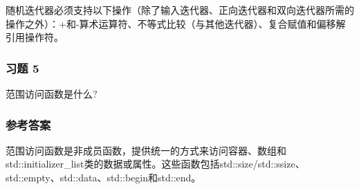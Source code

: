 随机迭代器必须支持以下操作（除了输入迭代器、正向迭代器和双向迭代器所需的操作之外）：+和-算术运算符、不等式比较（与其他迭代器）、复合赋值和偏移解引用操作符。

\subsubsection{习题 5}

范围访问函数是什么?

\subsubsection{参考答案}

范围访问函数是非成员函数，提供统一的方式来访问容器、数组和std::initializer\_list类的数据或属性。这些函数包括std::size/std::ssize、std::empty、std::data、std::begin和std::end。












